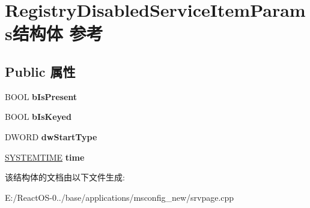 \hypertarget{struct_registry_disabled_service_item_params}{}\section{Registry\+Disabled\+Service\+Item\+Params结构体 参考}
\label{struct_registry_disabled_service_item_params}
\subsection*{Public 属性}
\begin{DoxyCompactItemize}
\item 
\mbox{\label{struct_registry_disabled_service_item_params_afee40f5b697b75e109f209a7c9c91510}} 
B\+O\+OL {\bfseries b\+Is\+Present}
\item 
\mbox{\label{struct_registry_disabled_service_item_params_af7bdbb7c0d1b061fb6719da1cf611a40}} 
B\+O\+OL {\bfseries b\+Is\+Keyed}
\item 
\mbox{\label{struct_registry_disabled_service_item_params_a9a4281aecb841b18798764e084fac3cf}} 
D\+W\+O\+RD {\bfseries dw\+Start\+Type}
\item 
\mbox{\label{struct_registry_disabled_service_item_params_a425edd508b731a017b2f022bb5a80d08}} 
\hyperlink{struct___s_y_s_t_e_m_t_i_m_e}{S\+Y\+S\+T\+E\+M\+T\+I\+ME} {\bfseries time}
\end{DoxyCompactItemize}


该结构体的文档由以下文件生成\+:\begin{DoxyCompactItemize}
\item 
E\+:/\+React\+O\+S-\/0../base/applications/msconfig\+\_\+new/srvpage.\+cpp\end{DoxyCompactItemize}
